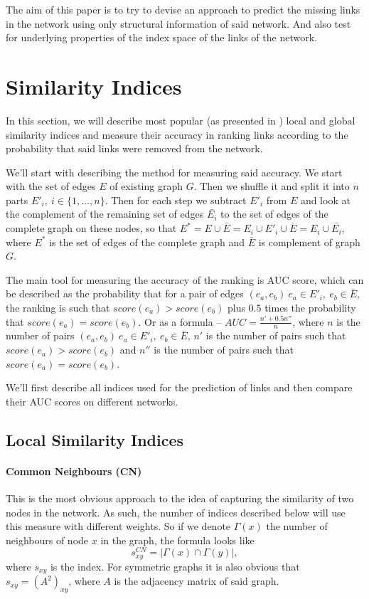\documentclass{llncs}
\begin{document}
The aim of this paper is to try to devise an approach to predict the missing links in the network using only structural information of said network. And also test for underlying properties of the index space of the links of the network.
%
\section{Similarity Indices}
%
In this section, we will describe most popular (as presented in \cite{survey}) local and global similarity indices and measure their accuracy in ranking links according to the probability that said links were removed from the network.

We'll start with describing the method for measuring said accuracy. We start with the set of edges $E$ of existing graph $G$. Then we shuffle it and split it into $n$ parts $E'_i, \ i \in \{1, \ldots, n\}$. Then for each step we subtract $E'_i$ from $E$ and look at the complement of the remaining set of edges $\bar{E_i}$ to the set of edges of the complete graph on these nodes, so that $E^* = E \cup \bar{E} = E_i \cup E'_i \cup \bar{E} = E_i \cup \bar{E_i}$, where $E^*$ is the set of edges of the complete graph and $\bar{E}$ is complement of graph $G$.

The main tool for measuring the accuracy of the ranking is AUC \cite{auc} score, which can be described as the probability that for a pair of edges $(e_a, e_b) \ e_a \in E'_i, \ e_b \in \bar{E}$, the ranking is such that $score(e_a) > score(e_b)$ plus $0.5$ times the probability that $score(e_a) = score(e_b)$. Or as a formula -- $AUC = \frac{n' + 0.5 n''}{n}$, where $n$ is the number of pairs $(e_a, e_b) \ e_a \in E'_i, \ e_b \in \bar{E}$, $n'$ is the number of pairs such that $score(e_a) > score(e_b)$ and $n''$ is the number of pairs such that $score(e_a) = score(e_b)$.

We'll first describe all indices used for the prediction of links and then compare their AUC scores on different networks.
%
\subsection{Local Similarity Indices}
%
\paragraph{Common Neighbours (CN)}
%
This is the most obvious approach to the idea of capturing the similarity of two nodes in the network. As such, the number of indices described below will use this measure with different weights. So if we denote $\Gamma(x)$ the number of neighbours of node $x$ in the graph, the formula looks like
\begin{equation}
s_{xy}^{CN} = |\Gamma(x) \cap \Gamma(y)|,
\end{equation}
where $s_{xy}$ is the index. For symmetric graphs it is also obvious that $s_{xy} = (A^2)_{xy}$, where $A$ is the adjacency matrix of said graph.
%
\end{document}
